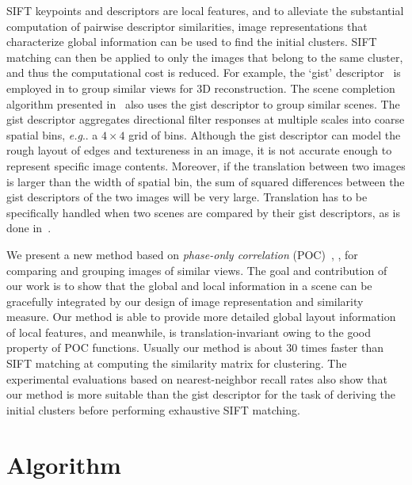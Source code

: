 \documentclass[conference]{IEEEtran}
\makeatletter
\DeclareRobustCommand\onedot{\futurelet\@let@token\@onedot}
\def\@onedot{\ifx\@let@token.\else.\null\fi\xspace}
\def\eg{\emph{e.g}\onedot} \def\Eg{\emph{E.g}\onedot}
\makeatother
\begin{document}
SIFT keypoints and descriptors are local features, and to alleviate the substantial computation of pairwise descriptor similarities, image representations that characterize global information can be used to find the initial clusters. SIFT matching can then be applied to only the images that belong to the same cluster, and thus the computational cost is reduced. For example, the `gist' descriptor~\cite{OlivaT01} is employed in \cite{LiWZLF08} to group similar views for 3D reconstruction. The scene completion algorithm presented in~\cite{HaysE08} also uses the gist descriptor to group similar scenes. The gist descriptor aggregates directional filter responses at multiple scales into coarse spatial bins, \eg a $4\times 4$ grid of bins. Although the gist descriptor can model the rough layout of edges and textureness in an image, it is not accurate enough to represent specific image contents. Moreover, if the translation between two images is larger than the width of spatial bin, the sum of squared differences between the gist descriptors of the two images will be very large. Translation has to be specifically handled when two scenes are compared by their gist descriptors, as is done in~\cite{SivicKTAF08}.

We present a new method based on {\em phase-only correlation} (POC)~\cite{ItoNKAH04}, \cite{ItoNAKKK08}, \cite{MiyazawaIAKN08} for comparing and grouping images of similar views. The goal and contribution of our work is to show that the global and local information in a scene can be gracefully integrated by our design of image representation and similarity measure. Our method is able to provide more detailed global layout information of local features, and meanwhile, is translation-invariant owing to the good property of POC functions. Usually our method is about $30$ times faster than SIFT matching at computing the similarity matrix for clustering. The experimental evaluations based on nearest-neighbor recall rates also show that our method is more suitable than the gist descriptor for the task of deriving the initial clusters before performing exhaustive SIFT matching. 


\section{Algorithm}
\end{document}
